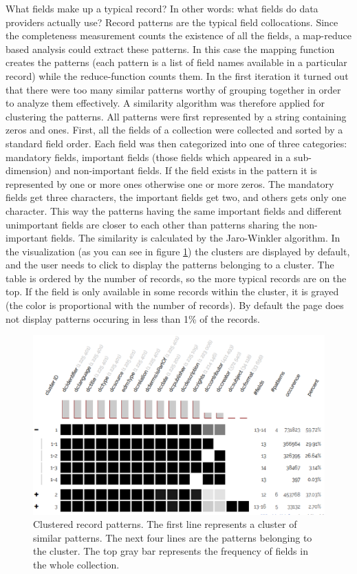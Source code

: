What fields make up a typical record? In other words: what fields do data providers actually use? Record patterns are the typical field collocations. Since the completeness measurement counts the existence of all the fields, a map-reduce based analysis could extract these patterns. In this case the mapping function creates the patterns (each pattern is a list of field names available in a particular record) while the reduce-function counts them. In the first iteration it turned out that there were too many similar patterns worthy of grouping together in order to analyze them effectively. A similarity algorithm was therefore applied for clustering the patterns. All patterns were first represented by a string containing zeros and ones. First, all the fields of a collection were collected and sorted by a standard field order. Each field was then categorized into one of three categories: mandatory fields, important fields (those fields which appeared in a sub-dimension) and non-important fields. If the field exists in the pattern it is represented by one or more ones otherwise one or more zeros. The mandatory fields get three characters, the important fields get two, and others gets only one character. This way the patterns having the same important fields and different unimportant fields are closer to each other than patterns sharing the non-important fields. The similarity is calculated by the Jaro-Winkler algorithm. In the visualization (as you can see in figure \ref{fig:patterns}) the clusters are displayed by default, and the user needs to click to display the patterns belonging to a cluster. The table is ordered by the number of records, so the more typical records are on the top. If the field is only available in some records within the cluster, it is grayed (the color is proportional with the number of records). By default the page does not display patterns occuring in less than 1\% of the records.

\begin{figure}[ht]
\includegraphics[width=\textwidth]{images/chapter02/clustered-patternsv05.eps}
\centering
\caption{Clustered record patterns. The first line represents a cluster of similar patterns. The next four lines are the patterns belonging to the cluster. The top gray bar represents the frequency of fields in the whole collection.}
\label{fig:patterns}
\end{figure}

